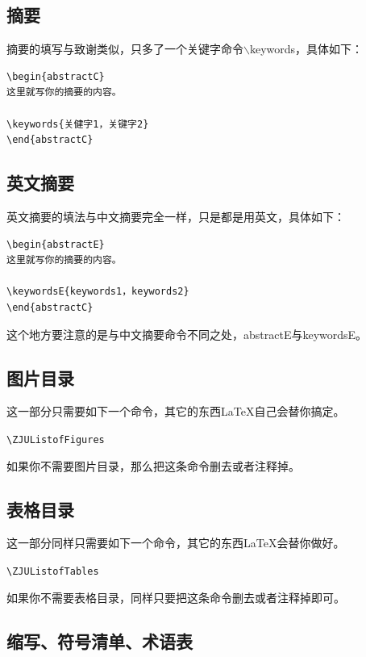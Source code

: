 \subsection{摘要}

摘要的填写与致谢类似，只多了一个关键字命令$\backslash$keywords，具体如下：

{
\linespread{1}
\noindent
\begin{verbatim}
\begin{abstractC}
这里就写你的摘要的内容。

\keywords{关健字1，关键字2}
\end{abstractC}
\end{verbatim}
}

\subsection{英文摘要}

英文摘要的填法与中文摘要完全一样，只是都是用英文，具体如下：

{
\linespread{1}
\noindent
\begin{verbatim}
\begin{abstractE}
这里就写你的摘要的内容。

\keywordsE{keywords1，keywords2}
\end{abstractC}
\end{verbatim}
}

这个地方要注意的是与中文摘要命令不同之处，abstractE与keywordsE。

\subsection{图片目录}

这一部分只需要如下一个命令，其它的东西\LaTeX 自己会替你搞定。

\verb+\ZJUListofFigures+

如果你不需要图片目录，那么把这条命令删去或者注释掉。

\subsection{表格目录}

这一部分同样只需要如下一个命令，其它的东西\LaTeX 会替你做好。

\verb+\ZJUListofTables+

如果你不需要表格目录，同样只要把这条命令删去或者注释掉即可。

\subsection{缩写、符号清单、术语表}

